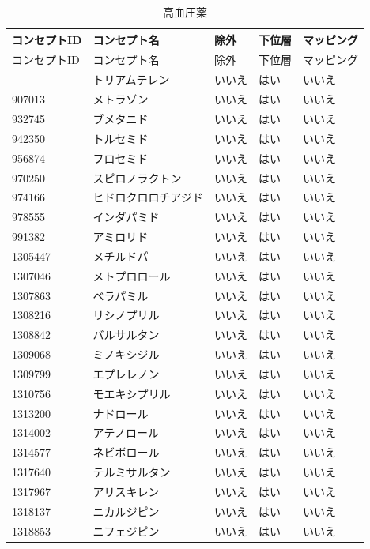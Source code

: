 \documentclass[
  11pt]{book}
\theoremstyle{definition}
\theoremstyle{definition}
\theoremstyle{definition}
\theoremstyle{definition}
\theoremstyle{remark}
\begin{document}
\begin{longtable}[]{@{}lllll@{}}
\caption{\label{tab:htnDrugsAceMono} 高血圧薬}\tabularnewline
\toprule\noalign{}
コンセプトID & コンセプト名 & 除外 & 下位層 & マッピング \\
\midrule\noalign{}
\endfirsthead
\toprule\noalign{}
コンセプトID & コンセプト名 & 除外 & 下位層 & マッピング \\
\midrule\noalign{}
\endhead
\bottomrule\noalign{}
\endlastfoot
904542 & トリアムテレン & いいえ & はい & いいえ \\
907013 & メトラゾン & いいえ & はい & いいえ \\
932745 & ブメタニド & いいえ & はい & いいえ \\
942350 & トルセミド & いいえ & はい & いいえ \\
956874 & フロセミド & いいえ & はい & いいえ \\
970250 & スピロノラクトン & いいえ & はい & いいえ \\
974166 & ヒドロクロロチアジド & いいえ & はい & いいえ \\
978555 & インダパミド & いいえ & はい & いいえ \\
991382 & アミロリド & いいえ & はい & いいえ \\
1305447 & メチルドパ & いいえ & はい & いいえ \\
1307046 & メトプロロール & いいえ & はい & いいえ \\
1307863 & ベラパミル & いいえ & はい & いいえ \\
1308216 & リシノプリル & いいえ & はい & いいえ \\
1308842 & バルサルタン & いいえ & はい & いいえ \\
1309068 & ミノキシジル & いいえ & はい & いいえ \\
1309799 & エプレレノン & いいえ & はい & いいえ \\
1310756 & モエキシプリル & いいえ & はい & いいえ \\
1313200 & ナドロール & いいえ & はい & いいえ \\
1314002 & アテノロール & いいえ & はい & いいえ \\
1314577 & ネビボロール & いいえ & はい & いいえ \\
1317640 & テルミサルタン & いいえ & はい & いいえ \\
1317967 & アリスキレン & いいえ & はい & いいえ \\
1318137 & ニカルジピン & いいえ & はい & いいえ \\
1318853 & ニフェジピン & いいえ & はい & いいえ \\

\end{longtable}
\end{document}
